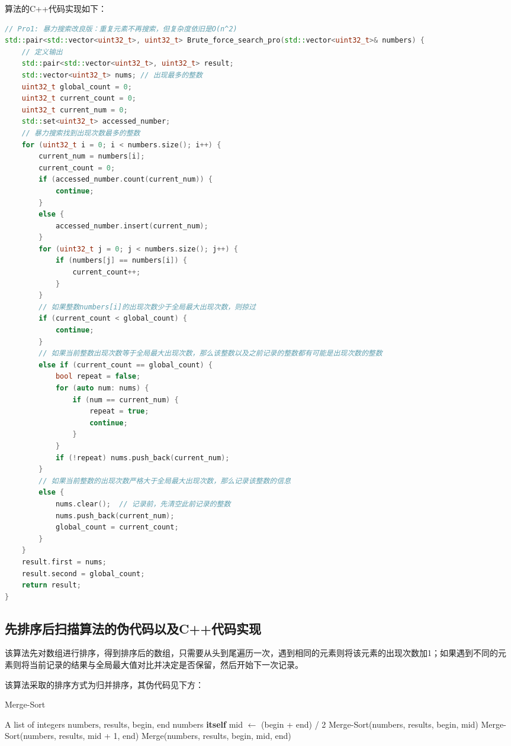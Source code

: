 \documentclass[UTF8,12pt,a4paper]{ctexart}
\begin{document}
算法的C++代码实现如下：
\begin{lstlisting}[language={C++}, basicstyle=\ttfamily\footnotesize]
// Pro1: 暴力搜索改良版：重复元素不再搜索，但复杂度依旧是O(n^2)
std::pair<std::vector<uint32_t>, uint32_t> Brute_force_search_pro(std::vector<uint32_t>& numbers) {
    // 定义输出
    std::pair<std::vector<uint32_t>, uint32_t> result;
    std::vector<uint32_t> nums; // 出现最多的整数
    uint32_t global_count = 0;
    uint32_t current_count = 0;
    uint32_t current_num = 0;
    std::set<uint32_t> accessed_number;
    // 暴力搜索找到出现次数最多的整数
    for (uint32_t i = 0; i < numbers.size(); i++) {
        current_num = numbers[i];
        current_count = 0;
        if (accessed_number.count(current_num)) {
            continue;
        }
        else {
            accessed_number.insert(current_num);
        }
        for (uint32_t j = 0; j < numbers.size(); j++) {
            if (numbers[j] == numbers[i]) {
                current_count++;
            }
        }
        // 如果整数numbers[i]的出现次数少于全局最大出现次数，则掠过
        if (current_count < global_count) {
            continue;
        }
        // 如果当前整数出现次数等于全局最大出现次数，那么该整数以及之前记录的整数都有可能是出现次数的整数
        else if (current_count == global_count) {
            bool repeat = false;
            for (auto num: nums) {
                if (num == current_num) {
                    repeat = true;
                    continue;
                }
            }
            if (!repeat) nums.push_back(current_num);
        }
        // 如果当前整数的出现次数严格大于全局最大出现次数，那么记录该整数的信息
        else {
            nums.clear();  // 记录前，先清空此前记录的整数
            nums.push_back(current_num);
            global_count = current_count;
        }
    }
    result.first = nums;
    result.second = global_count;
    return result;
}
\end{lstlisting}
\subsection{先排序后扫描算法的伪代码以及C++代码实现}
该算法先对数组进行排序，得到排序后的数组，只需要从头到尾遍历一次，遇到相同的元素则将该元素的出现次数加1；如果遇到不同的元素则将当前记录的结果与全局最大值对比并决定是否保留，然后开始下一次记录。

该算法采取的排序方式为归并排序，其伪代码见下方：
\begin{algorithm}[H]
	\caption{Merge-Sort}
	\begin{algorithmic}[1]
	\Require A list of integers $\text{numbers}$, results, begin, end
	\Ensure numbers \textbf{itself}
		\State mid $\gets$ (begin + end) / 2
		\State Merge-Sort(numbers, results, begin, mid)
		\State Merge-Sort(numbers, results, mid + 1, end)
		\State Merge(numbers, results, begin, mid, end)
	\EndIf
\end{algorithmic}
\end{algorithm}
\end{document}
